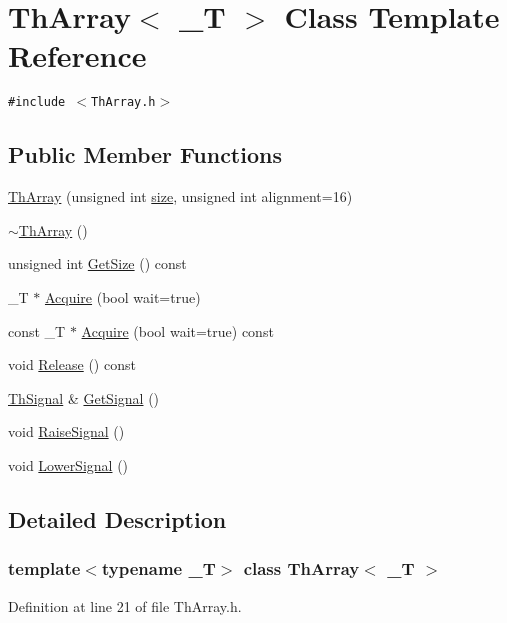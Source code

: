 \hypertarget{class_th_array}{
\section{ThArray$<$ \_\-T $>$ Class Template Reference}
\label{class_th_array}
}
{\tt \#include $<$ThArray.h$>$}

\subsection*{Public Member Functions}
\begin{CompactItemize}
\item 
\hyperlink{class_th_array_346b54454e47f36c5ad35ac0bc15fa18}{ThArray} (unsigned int \hyperlink{glext__bak_8h_3d1e3edfcf61ca2d831883e1afbad89e}{size}, unsigned int alignment=16)
\item 
\hyperlink{class_th_array_f1b88188b826afbad73c4fb6beecfbe9}{$\sim$ThArray} ()
\item 
unsigned int \hyperlink{class_th_array_cd3e0922e77945739c44b6777018f573}{GetSize} () const 
\item 
\_\-T $\ast$ \hyperlink{class_th_array_2cbd34eb6cb4e16974f6f38a3c3dd29f}{Acquire} (bool wait=true)
\item 
const \_\-T $\ast$ \hyperlink{class_th_array_b71fac6bac3509cb8cab776498291e56}{Acquire} (bool wait=true) const 
\item 
void \hyperlink{class_th_array_9daa6e66a5ef48fcf563fd72145416e8}{Release} () const 
\item 
\hyperlink{class_th_signal}{ThSignal} \& \hyperlink{class_th_array_a57430fcbaba277c7fe0e5daf5388fee}{GetSignal} ()
\item 
void \hyperlink{class_th_array_3168354fa6c74e1cbfbe309c49876f92}{RaiseSignal} ()
\item 
void \hyperlink{class_th_array_c9477c14645b87640a89fa95013e8f12}{LowerSignal} ()
\end{CompactItemize}


\subsection{Detailed Description}
\subsubsection*{template$<$typename \_\-T$>$ class ThArray$<$ \_\-T $>$}



Definition at line 21 of file ThArray.h.

